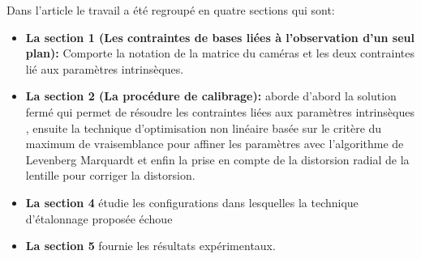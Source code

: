    Dans l'article le travail a été regroupé en quatre sections qui sont:\\
    
   \begin{itemize}
   	\item \textbf{La section 1 (Les contraintes de bases liées à l'observation d'un seul plan):} Comporte la notation de la matrice du caméras et les deux contraintes lié aux paramètres intrinsèques.\\
   	
   	\item \textbf{La section 2 (La procédure de calibrage):}  aborde d'abord la solution fermé qui permet de résoudre les contraintes liées aux paramètres intrinsèques , ensuite la technique d'optimisation non linéaire basée sur le critère du maximum de vraisemblance pour affiner les paramètres avec l'algorithme de Levenberg ­Marquardt et enfin la prise en compte de la distorsion radial de la lentille pour corriger la distorsion.\\
   	
   	\item \textbf{La section 4} étudie les configurations dans lesquelles la technique d'étalonnage proposée échoue\\
   	
   	\item \textbf{La section 5} fournie les résultats expérimentaux.
   \end{itemize}
   
   
   
   
   







